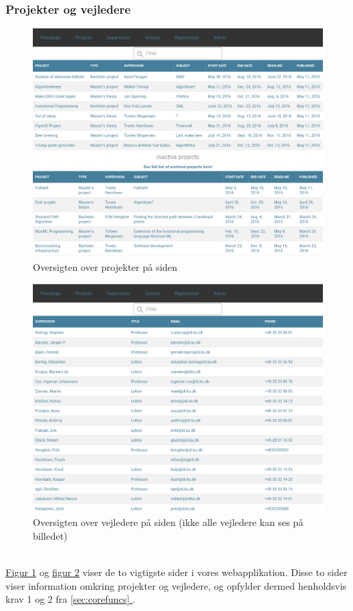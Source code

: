 \documentclass[12pt]{article}
\begin{document}
\subsubsection{Projekter og vejledere}
\begin{figure}[H]
    \centering
    \includegraphics[scale=0.33]{frontend_projects.png}
    \caption{Oversigten over projekter på siden}
    \label{fig:frontend_projects}
\end{figure}
\begin{figure}[H]
    \centering
    \includegraphics[scale=0.33]{frontend_supervisors.png}
    \caption{Oversigten over vejledere på siden (ikke alle vejledere kan ses på billedet)}
    \label{fig:frontend_supervisors}
\end{figure}
~\\
\hyperref[fig:frontend_projects]{Figur \ref*{fig:frontend_projects}} og \hyperref[fig:frontend_supervisors]{figur \ref*{fig:frontend_supervisors}} viser de to vigtigste sider i vores webapplikation. Disse to sider viser information omkring projekter og vejledere, og opfylder dermed henholdsvis krav 1 og 2 fra \hyperref[sec:corefuncs]{\ref*{sec:corefuncs} }.\\
\end{document}
